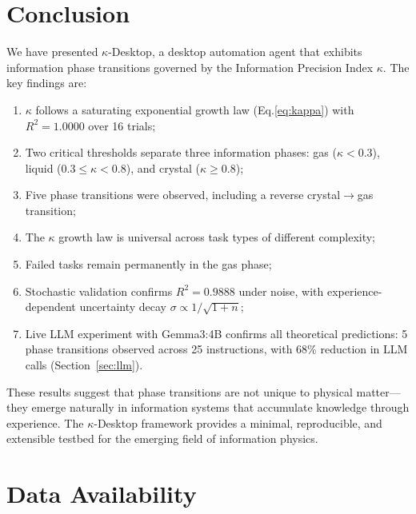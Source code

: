 \documentclass[10pt,twocolumn]{article}
\newcommand{\kap}{\kappa}
\newcommand{\kdes}{$\kappa$-Desktop}
\begin{document}
\vspace{1cm}

\section{Conclusion}

We have presented \kdes{}, a desktop automation agent that 
exhibits information phase transitions governed by the 
Information Precision Index $\kap$. The key findings are:

\begin{enumerate}[leftmargin=*, itemsep=2pt]
  \item $\kap$ follows a saturating exponential growth law 
    (Eq.\ref{eq:kappa}) with $R^2 = 1.0000$ over 16 
    trials;
  \item Two critical thresholds separate three information 
    phases: gas ($\kap < 0.3$), liquid 
    ($0.3 \leq \kap < 0.8$), and crystal ($\kap \geq 0.8$);
  \item Five phase transitions were observed, including 
    a reverse crystal$\to$gas transition;
  \item The $\kap$ growth law is universal across task 
    types of different complexity;
  \item Failed tasks remain permanently in the gas phase;
  \item Stochastic validation confirms $R^2 = 0.9888$ 
    under noise, with experience-dependent uncertainty 
    decay $\sigma \propto 1/\sqrt{1+n}$;
  \item Live LLM experiment with Gemma3:4B confirms 
    all theoretical predictions: 5 phase transitions 
    observed across 25 instructions, with 68\% reduction 
    in LLM calls (Section~\ref{sec:llm}).
\end{enumerate}

These results suggest that phase transitions are not unique 
to physical matter---they emerge naturally in information 
systems that accumulate knowledge through experience. The 
\kdes{} framework provides a minimal, reproducible, and 
extensible testbed for the emerging field of information 
physics.

\section*{Data Availability}
\end{document}
